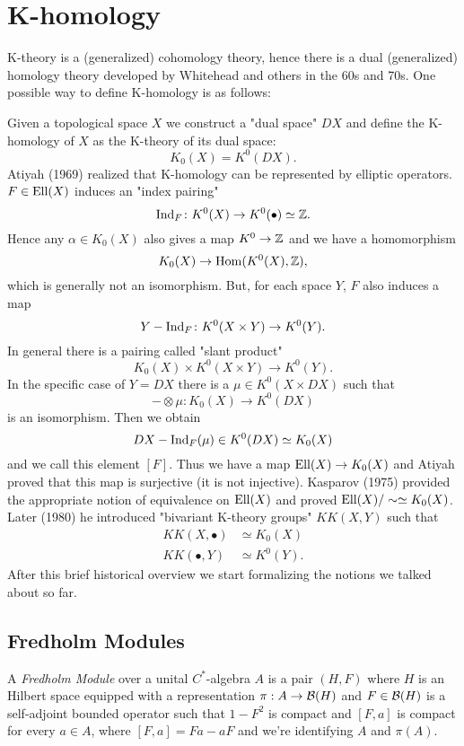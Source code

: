 
\section{K-homology}
K-theory is a (generalized) cohomology theory, hence there is a dual (generalized) homology theory developed by Whitehead and others in the 60s and 70s. One possible way to define K-homology is as follows:

\noindent Given a topological space $X$ we construct a "dual space" $DX$ and define the K-homology of $X$ as the K-theory of its dual space:
$$K_0(X)=K^0(DX).$$
Atiyah (1969) realized that K-homology can be represented by elliptic operators. $F\in\mathrm{Ell}(X)$ induces an "index pairing" 
$$\mathrm{Ind}_F\colon K^0(X)\to K^0(\bullet)\simeq\mathbb{Z}.$$ 
Hence any $\alpha\in K_0(X)$ also gives a map $K^0\to\mathbb{Z}$ and we have a homomorphism $$K_0(X)\to\mathrm{Hom}(K^0(X),\mathbb{Z}),$$ which is generally not an isomorphism. But, for each space $Y$, $F$ also induces a map $$Y-\mathrm{Ind}_F\colon K^0(X\times Y)\to K^0(Y).$$
In general there is a pairing called "slant product" $$K_0(X)\times K^0(X\times Y)\to K^0(Y).$$
In the specific case of $Y=DX$ there is a $\mu\in K^0(X\times DX)$ such that $$-\otimes\mu\colon K_0(X)\to K^0(DX)$$ is an 
isomorphism. Then we obtain $$DX-\mathrm{Ind}_F(\mu)\in K^0(DX)\simeq K_0(X)$$ and we call this element $[F]$. Thus we have a map 
$\mathrm{Ell}(X)\to K_0(X)$ and Atiyah proved that this map is surjective (it is not injective). Kasparov (1975) provided the appropriate notion of equivalence on $\mathrm{Ell}(X)$ and proved $\mathrm{Ell}(X)/\sim\simeq K_0(X)$. Later (1980) he introduced "bivariant K-theory groups" $KK(X,Y)$ such that \begin{align*} KK(X,\bullet)&\simeq K_0(X)\\KK(\bullet,Y)&\simeq K^0(Y). \end{align*}
After this brief historical overview we start formalizing the notions we talked about so far.

\subsection{Fredholm Modules}
\begin{definition}
 A \emph{Fredholm Module} over a unital $C^\ast$-algebra $A$ is a pair $(H,F)$ where $H$ is an Hilbert space equipped with a representation $\pi:A\to\mathcal{B}(H)$ and $F\in\mathcal{B}(H)$ is a self-adjoint bounded operator such that $1-F^2$ is compact and $[F,a]$ is compact for every $a\in A$, where $[F,a]=Fa-aF$ and we're identifying $A$ and $\pi(A)$. 
\end{definition}

